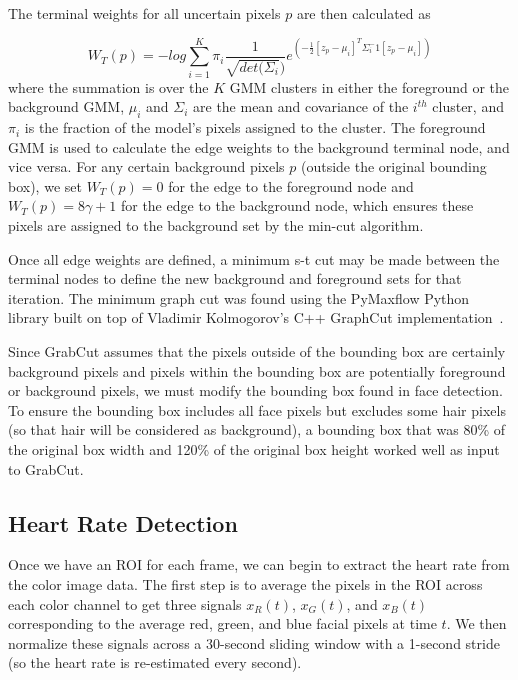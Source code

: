 \documentclass[10pt,twocolumn,letterpaper]{article}
\begin{document}
The terminal weights for all uncertain pixels $p$ are then calculated as

$$W_T(p) = - log \sum_{i=1}^K \pi_i \frac{1}{\sqrt{det(\Sigma_i})} e^{(-\frac{1}{2}[z_p-\mu_i]^T \Sigma_i^-1 [z_p - \mu_i])}$$
where the summation is over the $K$ GMM clusters in either the foreground or the background GMM, $\mu_i$ and $\Sigma_i$ are the mean and covariance of the $i^{th}$ cluster, and $\pi_i$ is the fraction of the model's pixels assigned to the cluster. The foreground GMM is used to calculate the edge weights to the background terminal node, and vice versa. For any certain background pixels $p$ (outside the original bounding box), we set $W_T(p) = 0$ for the edge to the foreground node and $W_T(p) = 8\gamma + 1$ for the edge to the background node, which ensures these pixels are assigned to the background set by the min-cut algorithm.

Once all edge weights are defined, a minimum s-t cut may be made between the terminal nodes to define the new background and foreground sets for that iteration. The minimum graph cut was found using the PyMaxflow Python library built on top of Vladimir Kolmogorov's C++ GraphCut implementation~\cite{Boykov:2004aa}.

Since GrabCut assumes that the pixels outside of the bounding box are certainly background pixels and pixels within the bounding box are potentially foreground or background pixels, we must modify the bounding box found in face detection. To ensure the bounding box includes all face pixels but excludes some hair pixels (so that hair will be considered as background), a bounding box that was 80\% of the original box width and 120\% of the original box height worked well as input to GrabCut.

\subsection{Heart Rate Detection} \label{hr_detection}

Once we have an ROI for each frame, we can begin to extract the heart rate from the color image data. The first step is to average the pixels in the ROI across each color channel to get three signals $x_R(t)$, $x_G(t)$, and $x_B(t)$ corresponding to the average red, green, and blue facial pixels at time $t$. We then normalize these signals across a 30-second sliding window with a 1-second stride (so the heart rate is re-estimated every second).
\end{document}
